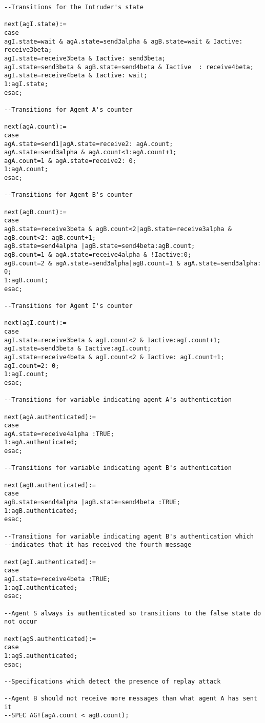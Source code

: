 \begin{appendix}
{\begin{verbatim}
--Transitions for the Intruder's state

next(agI.state):=
case
agI.state=wait & agA.state=send3alpha & agB.state=wait & Iactive: receive3beta;
agI.state=receive3beta & Iactive: send3beta;
agI.state=send3beta & agB.state=send4beta & Iactive  : receive4beta;
agI.state=receive4beta & Iactive: wait;
1:agI.state;
esac;

--Transitions for Agent A's counter

next(agA.count):=
case
agA.state=send1|agA.state=receive2: agA.count;
agA.state=send3alpha & agA.count<1:agA.count+1;
agA.count=1 & agA.state=receive2: 0;
1:agA.count;
esac;

--Transitions for Agent B's counter

next(agB.count):=
case
agB.state=receive3beta & agB.count<2|agB.state=receive3alpha & agB.count<2: agB.count+1;
agB.state=send4alpha |agB.state=send4beta:agB.count;
agB.count=1 & agA.state=receive4alpha & !Iactive:0;
agB.count=2 & agA.state=send3alpha|agB.count=1 & agA.state=send3alpha: 0;
1:agB.count;
esac;

--Transitions for Agent I's counter

next(agI.count):=
case
agI.state=receive3beta & agI.count<2 & Iactive:agI.count+1;
agI.state=send3beta & Iactive:agI.count;
agI.state=receive4beta & agI.count<2 & Iactive: agI.count+1;
agI.count=2: 0;
1:agI.count;
esac;

--Transitions for variable indicating agent A's authentication

next(agA.authenticated):=
case
agA.state=receive4alpha :TRUE;
1:agA.authenticated;
esac;

--Transitions for variable indicating agent B's authentication

next(agB.authenticated):=
case
agB.state=send4alpha |agB.state=send4beta :TRUE;
1:agB.authenticated;
esac;

--Transitions for variable indicating agent B's authentication which 
--indicates that it has received the fourth message

next(agI.authenticated):=
case
agI.state=receive4beta :TRUE;
1:agI.authenticated;
esac;

--Agent S always is authenticated so transitions to the false state do not occur

next(agS.authenticated):=
case
1:agS.authenticated;
esac;

--Specifications which detect the presence of replay attack

--Agent B should not receive more messages than what agent A has sent it
--SPEC AG!(agA.count < agB.count);


\end{verbatim}}
\end{appendix}
